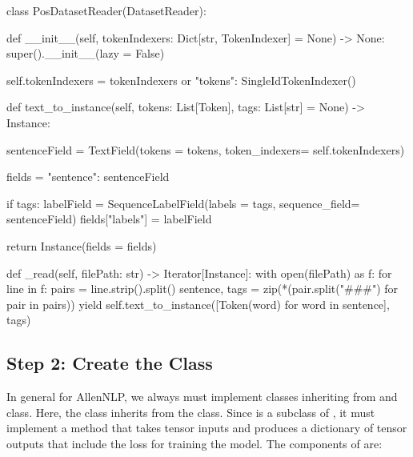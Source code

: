 \begin{pythonCode}

class PosDatasetReader(DatasetReader):

    def __init__(self, tokenIndexers: Dict[str, TokenIndexer] = None) -> None:
        super().__init__(lazy = False)

        self.tokenIndexers = tokenIndexers or {"tokens": SingleIdTokenIndexer()}


    def text_to_instance(self, tokens: List[Token], tags: List[str] = None) -> Instance:

        sentenceField = TextField(tokens = tokens,
                                  token_indexers= self.tokenIndexers)

        fields = {"sentence": sentenceField}

        if tags:
            labelField = SequenceLabelField(labels = tags,
                                            sequence_field= sentenceField)
            fields["labels"] = labelField


        return Instance(fields = fields)


    def _read(self, filePath: str) -> Iterator[Instance]:
        with open(filePath) as f:
            for line in f:
                pairs = line.strip().split()
                sentence, tags = zip(*(pair.split("###") for pair in pairs))
                yield self.text_to_instance([Token(word) for word in sentence], tags)


\end{pythonCode} 







\subsection*{Step 2: Create the  Class}

In general for AllenNLP, we always must implement classes inheriting from  and  class. Here, the  class inherits from the  class. Since  is a subclass of , it must implement a  method that takes tensor inputs and produces a dictionary of tensor outputs that include the loss for training the model. The components of  are: 

